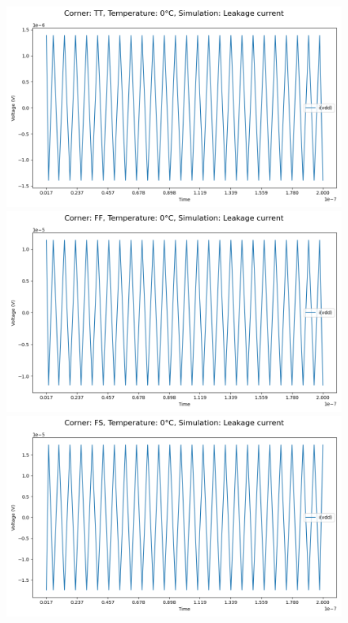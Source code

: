 \begin{figure}[H]
    \centering
    \includegraphics[height= 0.21\textheight]{figures/aimspice/TT/0/I.csv.png}
    \vspace{5pt}
    \includegraphics[height= 0.21\textheight]{figures/aimspice/FF/0/I.csv.png}
    \vspace{5pt}
    \includegraphics[height= 0.21\textheight]{figures/aimspice/FS/0/I.csv.png}

\end{figure}

